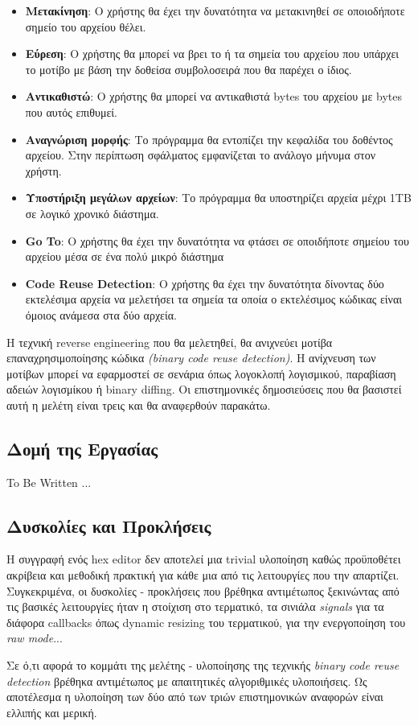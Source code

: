 \begin{itemize}
    \item \textbf{Μετακίνηση}: Ο χρήστης θα έχει την δυνατότητα να μετακινηθεί σε οποιοδήποτε σημείο του αρχείου θέλει.
    
    \item \textbf{Εύρεση}: Ο χρήστης θα μπορεί να βρει το ή τα σημεία του αρχείου που υπάρχει το μοτίβο με βάση την δοθείσα συμβολοσειρά που θα παρέχει ο ίδιος.
    
    \item \textbf{Αντικαθιστώ}: Ο χρήστης θα μπορεί να αντικαθιστά bytes του αρχείου με bytes που αυτός επιθυμεί.
    
    \item \textbf{Αναγνώριση μορφής}: Το πρόγραμμα θα εντοπίζει την κεφαλίδα του δοθέντος αρχείου. Στην περίπτωση σφάλματος εμφανίζεται το ανάλογο μήνυμα στον χρήστη. 
    
    \item \textbf{Υποστήριξη μεγάλων αρχείων}: Το πρόγραμμα θα υποστηρίζει αρχεία μέχρι 1TB σε λογικό χρονικό διάστημα.
    
    \item \textbf{Go To}: Ο χρήστης θα έχει την δυνατότητα να φτάσει σε οποιδήποτε σημείου του αρχείου μέσα σε ένα πολύ μικρό διάστημα

    \item \textbf{Code Reuse Detection}: Ο χρήστης θα έχει την δυνατότητα δίνοντας δύο εκτελέσιμα αρχεία να μελετήσει τα σημεία τα οποία ο εκτελέσιμος κώδικας είναι όμοιος ανάμεσα στα δύο αρχεία.

\end{itemize}

Η τεχνική reverse engineering που θα μελετηθεί, θα ανιχνεύει μοτίβα επαναχρησιμοποίησης κώδικα \emph{(binary code reuse detection)}.
Η ανίχνευση των μοτίβων μπορεί να εφαρμοστεί σε σενάρια όπως λογοκλοπή λογισμικού, παραβίαση αδειών λογισμίκου ή binary diffing.
Οι επιστημονικές δημοσιεύσεις που θα βασιστεί αυτή η μελέτη είναι τρεις και θα αναφερθούν παρακάτω.

\pagebreak
\subsection{Δομή της Εργασίας}
To Be Written
...

\subsection{Δυσκολίες και Προκλήσεις}
Η συγγραφή ενός hex editor δεν αποτελεί μια trivial υλοποίηση καθώς προϋποθέτει ακρίβεια και μεθοδική πρακτική για κάθε μια από τις λειτουργίες που την απαρτίζει.
Συγκεκριμένα, οι δυσκολίες - προκλήσεις που βρέθηκα αντιμέτωπος ξεκινώντας από τις βασικές λειτουργίες ήταν η στοίχιση στο τερματικό, τα σινιάλα \emph{signals} για τα διάφορα callbacks όπως dynamic resizing του τερματικού, για την ενεργοποίηση του \emph{raw mode}...

Σε ό,τι αφορά το κομμάτι της μελέτης - υλοποίησης της τεχνικής \emph{binary code reuse detection} βρέθηκα αντιμέτωπος με απαιτητικές αλγοριθμικές υλοποιήσεις. Ως αποτέλεσμα η υλοποίηση των δύο από των τριών επιστημονικών αναφορών είναι ελλιπής και μερική.
